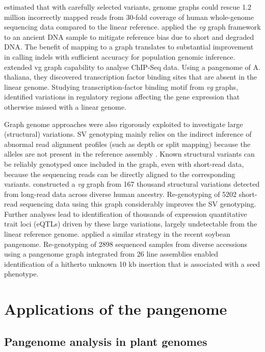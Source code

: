 \documentclass[../main.tex]{subfiles}
\begin{document}
\citet{pritt2018forge} estimated that with carefully selected variants, genome graphs could rescue 1.2 million incorrectly mapped reads from 30-fold coverage of human whole-genome sequencing data compared to the linear reference. \citet{martiniano2019removing} applied the \emph{vg} graph framework to an ancient DNA sample to mitigate reference bias due to short and degraded DNA. The benefit of mapping to a graph translates to substantial improvement in calling indels with sufficient accuracy for population genomic inference. \citet{grytten2019graph} extended vg graph capability to analyse ChIP-Seq data. Using a pangenome  of A. thaliana, they discovered transcription factor binding sites that are absent in the linear genome. Studying transcription-factor binding motif from \emph{vg} graphs, \citet{tognon2021grafimo} identified variations in regulatory regions affecting the gene expression that otherwise missed with a linear genome. 

Graph genome approaches were also rigorously exploited to investigate large (structural) variations. SV genotyping mainly relies on the indirect inference of abnormal read alignment profiles (such as depth or split mapping) because the alleles are not present in the reference assembly \citep{mahmoud2019structural}. Known structural variants can be reliably  genotyped once included in the graph, even with short-read data, because the sequencing reads can be directly aligned to the corresponding variants. \citet{siren2020haplotype} constructed a \emph{vg} graph from 167 thousand structural variations detected from long-read data across diverse human ancestry. Re-genotyping of 5202 short-read sequencing data using this graph considerably improves the SV genotyping. Further analyses lead to identification of thousands of expression quantitative trait loci (eQTLs) driven by these large variations, largely undetectable from the linear reference genome. \citet{liu2020pan}  applied a similar strategy in the recent soybean pangenome. Re-genotyping of 2898 sequenced samples from diverse accessions using a pangenome graph integrated from 26 line assemblies enabled identification of a hitherto unknown 10 kb insertion that is associated with a seed phenotype. 

\section{Applications of the pangenome}

\subsection{Pangenome analysis in plant genomes}
\end{document}
